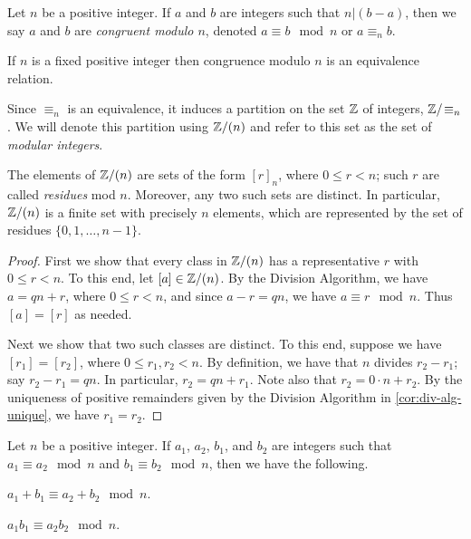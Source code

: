 \begin{dfn}
Let \(n\) be a positive integer.
If \(a\) and \(b\) are integers such that \(n|(b-a)\), then we say \(a\) and \(b\) are \emph{congruent modulo \(n\)}, denoted \(a \equiv b \mod n\) or \(a \equiv_n b\).
\end{dfn}

\begin{prop}
If \(n\) is a fixed positive integer then congruence modulo \(n\) is an equivalence relation. 
\end{prop}

Since \(\equiv_n\) is an equivalence, it induces a partition on the set \(\mathbb{Z}\) of integers, \(\mathbb{Z}/\!\equiv_n\).
We will denote this partition using \(\mathbb{Z}/(n)\) and refer to this set as the set of \emph{modular integers}.

\begin{prop}
The elements of \(\mathbb{Z}/(n)\) are sets of the form \([r]_n\), where \(0 \leq r < n\); such \(r\) are called \emph{residues} mod \(n\).
Moreover, any two such sets are distinct.
In particular, \(\mathbb{Z}/(n)\) is a finite set with precisely \(n\) elements, which are represented by the set of residues \(\{0,1,\ldots,n-1\}\). 
\end{prop}

\begin{proof}
First we show that every class in \(\mathbb{Z}/(n)\) has a representative \(r\) with \(0 \leq r < n\).
To this end, let \([a] \in \mathbb{Z}/(n)\).
By the Division Algorithm, we have \(a = qn + r\), where \(0 \leq r < n\), and since \(a - r = qn\), we have \(a \equiv r \mod n\).
Thus \([a] = [r]\) as needed.

Next we show that two such classes are distinct.
To this end, suppose we have \([r_1] = [r_2]\), where \(0 \leq r_1, r_2 < n\).
By definition, we have that \(n\) divides \(r_2 - r_1\); say \(r_2 - r_1 = qn\).
In particular, \(r_2 = qn + r_1\).
Note also that \(r_2 = 0 \cdot n + r_2\).
By the uniqueness of positive remainders given by the Division Algorithm in \ref{cor:div-alg-unique}, we have \(r_1 = r_2\).
\end{proof}


\begin{prop}
Let \(n\) be a positive integer.
If \(a_1\), \(a_2\), \(b_1\), and \(b_2\) are integers such that \(a_1 \equiv a_2 \mod n\) and \(b_1 \equiv b_2 \mod n\), then we have the following.
\begin{proplist}
\item \(a_1 + b_1 \equiv a_2 + b_2 \mod n\).
\item \(a_1 b_1 \equiv a_2 b_2 \mod n\).
\end{proplist}
\end{prop}

